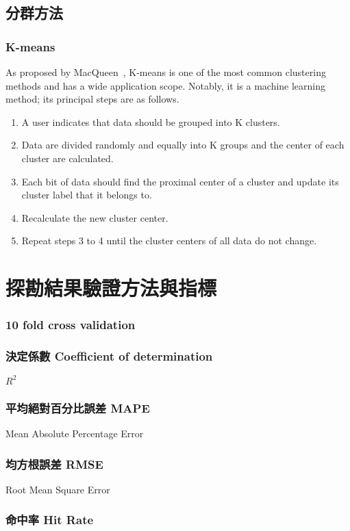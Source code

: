 \subsection{分群方法}

\subsubsection{K-means}

As proposed by MacQueen~\cite{macqueen67}, K-means is one of the most common clustering methods and has a wide application scope. Notably, it is a machine learning method; its principal steps are as follows.

\begin{enumerate}
\item A user indicates that data should be grouped into K clusters.
\item Data are divided randomly and equally into K groups and the center of each cluster are calculated.
\item Each bit of data should find the proximal center of a cluster and update its cluster label that it belongs to.
\item Recalculate the new cluster center.
\item Repeat steps 3 to 4 until the cluster centers of all data do not change.
\end{enumerate}


\section{探勘結果驗證方法與指標}

\subsubsection{10 fold cross validation}

\subsubsection{決定係數 Coefficient of determination}

$R^2$

\subsubsection{平均絕對百分比誤差 MAPE}

Mean Absolute Percentage Error

\subsubsection{均方根誤差 RMSE}

Root Mean Square Error

\subsubsection{命中率 Hit Rate}

